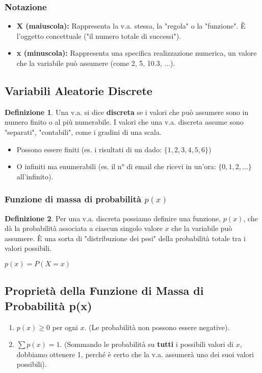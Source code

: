 \documentclass[a4paper, 11pt]{article}
\theoremstyle{definition}
\newtheorem{definizione}{Definizione}[section]
\begin{document}
\subsubsection*{Notazione}
\begin{itemize}
    \item \textbf{X (maiuscola):} Rappresenta la v.a. stessa, la "regola" o la "funzione". È l'oggetto concettuale ("il numero totale di successi").
    \item \textbf{x (minuscola):} Rappresenta una specifica realizzazione numerica, un valore che la variabile può assumere (come 2, 5, 10.3, ...).
\end{itemize}

\subsection{Variabili Aleatorie Discrete}
\begin{definizione}
Una v.a. si dice \textbf{discreta} se i valori che può assumere sono in numero finito o al più numerabile. I valori che una v.a. discreta assume sono "separati", "contabili", come i gradini di una scala.
\begin{itemize}
    \item Possono essere finiti (es. i risultati di un dado: $\{1,2,3,4,5,6\}$)
    \item O infiniti ma enumerabili (es. il n° di email che ricevi in un'ora: $\{0, 1, 2, \dots\}$ all'infinito).
\end{itemize}
\end{definizione}

\subsubsection{Funzione di massa di probabilità $p(x)$}
\begin{definizione}
Per una v.a. discreta possiamo definire una funzione, $p(x)$, che dà la probabilità associata a ciascun singolo valore $x$ che la variabile può assumere. È una sorta di "distribuzione dei pesi" della probabilità totale tra i valori possibili.
\begin{formulabox}
    $p(x) = P(X=x)$
\end{formulabox}
\end{definizione}

\subsection{Proprietà della Funzione di Massa di Probabilità p(x)}
\begin{enumerate}
    \item $p(x) \ge 0$ per ogni $x$. (Le probabilità non possono essere negative).
    \item $\sum p(x) = 1$. (Sommando le probabilità su \textbf{tutti} i possibili valori di $x$, dobbiamo ottenere 1, perché è certo che la v.a. assumerà uno dei suoi valori possibili).
\end{enumerate}
\end{document}
